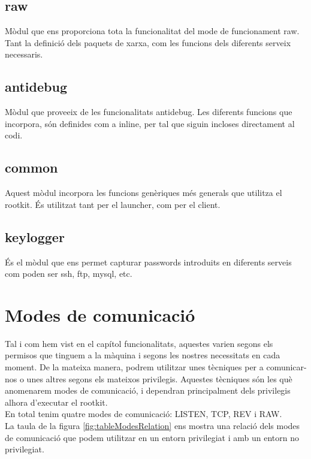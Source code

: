 \subsection{raw}

Mòdul que ens proporciona tota la funcionalitat del mode de funcionament raw. Tant la definició dels
paquets de xarxa, com les funcions dels diferents serveix necessaris.

\subsection{antidebug}

Mòdul que proveeix de les funcionalitats antidebug. Les diferents funcions que incorpora, són definides
com a inline, per tal que siguin incloses directament al codi.

\subsection{common}

Aquest mòdul incorpora les funcions genèriques més generals que utilitza el rootkit. És utilitzat tant per
el launcher, com per el client.

\subsection{keylogger}

És el mòdul que ens permet capturar passwords introduits en diferents serveis com poden ser ssh, ftp, mysql, etc.
\section{Modes de comunicació}

Tal i com hem vist en el capítol funcionalitats, aquestes varien segons els permisos que tinguem a la màquina 
i segons les nostres necessitats en cada moment. De la mateixa manera, podrem utilitzar unes tècniques per a
comunicar-nos o unes altres segons els mateixos privilegis. Aquestes tècniques són les què anomenarem modes
de comunicació, i dependran principalment dels privilegis alhora d'executar el rootkit.\\

En total tenim quatre modes de comunicació: LISTEN, TCP, REV i RAW. \\

La taula de la figura  \ref{fig:tableModesRelation} ens mostra una relació dels modes de comunicació que podem utilitzar
en un entorn privilegiat i amb un entorn no privilegiat.

